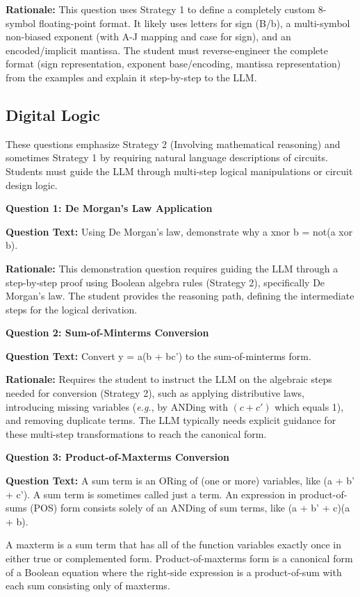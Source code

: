 \documentclass{article} %
\begin{document}
\textbf{Rationale:} This question uses Strategy 1 to define a completely custom 8-symbol floating-point format. It likely uses letters for sign (B/b), a multi-symbol non-biased exponent (with A-J mapping and case for sign), and an encoded/implicit mantissa. The student must reverse-engineer the complete format (sign representation, exponent base/encoding, mantissa representation) from the examples and explain it step-by-step to the LLM.

\subsection{Digital Logic}
These questions emphasize {Strategy 2 (Involving mathematical reasoning)} and sometimes Strategy 1 by requiring natural language descriptions of circuits. Students must guide the LLM through multi-step logical manipulations or circuit design logic.

\textbf{Question 1: De Morgan's Law Application}

\textbf{Question Text:} Using De Morgan's law, demonstrate why a xnor b = not(a xor b).

\textbf{Rationale:} This demonstration question requires guiding the LLM through a step-by-step proof using Boolean algebra rules (Strategy 2), specifically De Morgan's law. The student provides the reasoning path, defining the intermediate steps for the logical derivation.

\textbf{Question 2: Sum-of-Minterms Conversion}

\textbf{Question Text:} Convert y = a(b + bc') to the sum-of-minterms form.

\textbf{Rationale:} Requires the student to instruct the LLM on the algebraic steps needed for conversion (Strategy 2), such as applying distributive laws, introducing missing variables ({\em e.g.}, by ANDing with $(c+c')$ which equals 1), and removing duplicate terms. The LLM typically needs explicit guidance for these multi-step transformations to reach the canonical form.

\textbf{Question 3: Product-of-Maxterms Conversion}

\textbf{Question Text:} A sum term is an ORing of (one or more) variables, like (a + b' + c'). A sum term is sometimes called just a term. An expression in product-of-sums (POS) form consists solely of an ANDing of sum terms, like (a + b' + c)(a + b).

A maxterm is a sum term that has all of the function variables exactly once in either true or complemented form. Product-of-maxterms form is a canonical form of a Boolean equation where the right-side expression is a product-of-sum with each sum consisting only of maxterms.
\end{document}
